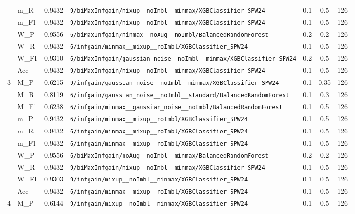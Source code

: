 \begin{table}[htbp]
\begin{tabular}{|c|l|c|>{\ttfamily\footnotesize}p{7.2cm}|c|c|c|}
 & m\_R & 0.9432 & \texttt{9/biMaxInfgain/mixup\_\_noImbl\_\_minmax/XGBClassifier\_SPW24} & 0.1 & 0.5  & 126 \\ 
 & m\_F1 & 0.9432 & \texttt{9/biMaxInfgain/mixup\_\_noImbl\_\_minmax/XGBClassifier\_SPW24} & 0.1 & 0.5  & 126 \\ 
 & W\_P & 0.9556 & \texttt{6/biMaxInfgain/minmax\_\_noAug\_\_noImbl/BalancedRandomForest} & 0.2 & 0.2  & 126 \\ 
 & W\_R & 0.9432 & \texttt{6/infgain/minmax\_\_mixup\_\_noImbl/XGBClassifier\_SPW24} & 0.1 & 0.5  & 126 \\ 
 & W\_F1 & 0.9310 & \texttt{6/biMaxInfgain/gaussian\_noise\_\_noImbl\_\_minmax/XGBClassifier\_SPW24} & 0.2 & 0.5  & 126 \\ 
 & Acc & 0.9432 & \texttt{9/biMaxInfgain/mixup\_\_noImbl\_\_minmax/XGBClassifier\_SPW24} & 0.1 & 0.5  & 126 \\ 
\hline
\multirow{10}{*}{3} & M\_P & 0.6215 & \texttt{9/infgain/gaussian\_noise\_\_noImbl\_\_minmax/XGBClassifier\_SPW24} & 0.1 & 0.35  & 126 \\ 
 & M\_R & 0.8119 & \texttt{6/infgain/gaussian\_noise\_\_noImbl\_\_standard/BalancedRandomForest} & 0.1 & 0.3  & 126 \\ 
 & M\_F1 & 0.6238 & \texttt{6/infgain/minmax\_\_gaussian\_noise\_\_noImbl/BalancedRandomForest} & 0.1 & 0.5  & 126 \\ 
 & m\_P & 0.9432 & \texttt{6/infgain/minmax\_\_mixup\_\_noImbl/XGBClassifier\_SPW24} & 0.1 & 0.5  & 126 \\ 
 & m\_R & 0.9432 & \texttt{6/infgain/minmax\_\_mixup\_\_noImbl/XGBClassifier\_SPW24} & 0.1 & 0.5  & 126 \\ 
 & m\_F1 & 0.9432 & \texttt{6/infgain/minmax\_\_mixup\_\_noImbl/XGBClassifier\_SPW24} & 0.1 & 0.5  & 126 \\ 
 & W\_P & 0.9556 & \texttt{6/biMaxInfgain/noAug\_\_noImbl\_\_minmax/BalancedRandomForest} & 0.2 & 0.2  & 126 \\ 
 & W\_R & 0.9432 & \texttt{9/biMaxInfgain/mixup\_\_noImbl\_\_minmax/XGBClassifier\_SPW24} & 0.1 & 0.5  & 126 \\ 
 & W\_F1 & 0.9303 & \texttt{9/infgain/mixup\_\_noImbl\_\_minmax/XGBClassifier\_SPW24} & 0.1 & 0.5  & 126 \\ 
 & Acc & 0.9432 & \texttt{6/infgain/minmax\_\_mixup\_\_noImbl/XGBClassifier\_SPW24} & 0.1 & 0.5  & 126 \\ 
\hline
\multirow{10}{*}{4} & M\_P & 0.6144 & \texttt{9/infgain/mixup\_\_noImbl\_\_minmax/XGBClassifier\_SPW24} & 0.1 & 0.5  & 126 \\ 

\end{tabular}
\end{table}
